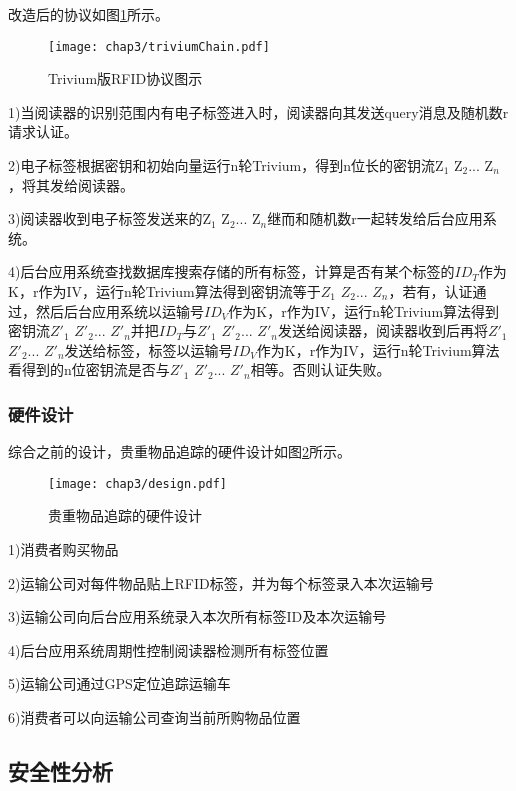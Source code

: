 改造后的协议如图\ref{fig:Trivium版RFID协议图示}所示。

\begin{figure}[H]
	\centering
	\texttt{[image: chap3/triviumChain.pdf]}
	\caption{Trivium版RFID协议图示}\label{fig:Trivium版RFID协议图示}
\end{figure}

1)当阅读器的识别范围内有电子标签进入时，阅读器向其发送query消息及随机数r请求认证。

2)电子标签根据密钥和初始向量运行n轮Trivium，得到n位长的密钥流Z$_{1}$ Z$_{2}$... Z$_{n}$，将其发给阅读器。

3)阅读器收到电子标签发送来的Z$_{1}$ Z$_{2}$... Z$_{n}$继而和随机数r一起转发给后台应用系统。

4)后台应用系统查找数据库搜索存储的所有标签，计算是否有某个标签的$ID_{T}$作为K，r作为IV，运行n轮Trivium算法得到密钥流等于$Z_{1}$ $Z_{2}$... $Z_{n}$，若有，认证通过，然后后台应用系统以运输号$ID_{V}$作为K，r作为IV，运行n轮Trivium算法得到密钥流$Z'_{1}$ $Z'_{2}$... $Z'_{n}$并把$ID_{T}$与$Z'_{1}$ $Z'_{2}$... $Z'_{n}$发送给阅读器，阅读器收到后再将$Z'_{1}$ $Z'_{2}$... $Z'_{n}$发送给标签，标签以运输号$ID_{V}$作为K，r作为IV，运行n轮Trivium算法看得到的n位密钥流是否与$Z'_{1}$ $Z'_{2}$... $Z'_{n}$相等。否则认证失败。

\subsubsection{硬件设计}

综合之前的设计，贵重物品追踪的硬件设计如图\ref{fig:贵重物品追踪的硬件设计}所示。

\begin{figure}[H]
	\centering
	\texttt{[image: chap3/design.pdf]}
	\caption{贵重物品追踪的硬件设计}\label{fig:贵重物品追踪的硬件设计}
\end{figure}

1)消费者购买物品

2)运输公司对每件物品贴上RFID标签，并为每个标签录入本次运输号

3)运输公司向后台应用系统录入本次所有标签ID及本次运输号

4)后台应用系统周期性控制阅读器检测所有标签位置

5)运输公司通过GPS定位追踪运输车

6)消费者可以向运输公司查询当前所购物品位置

\subsection{安全性分析}


